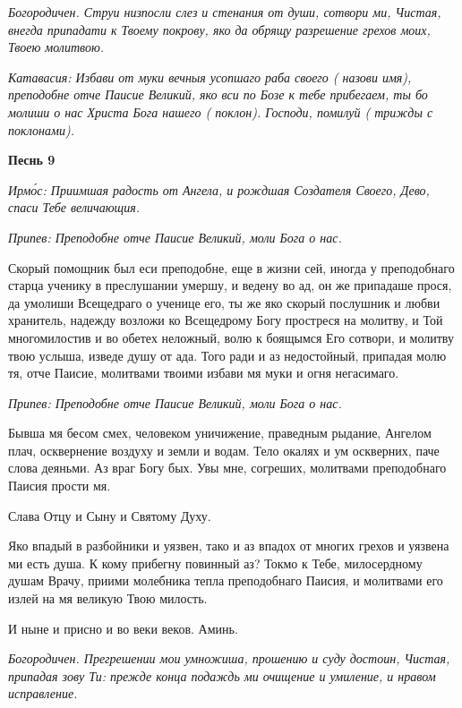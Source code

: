 \itshape Богородичен.\normalfont{} Струи низпосли слез и стенания от души, сотвори ми, Чистая, внегда припадати к Твоему покрову, яко да обрящу разрешение грехов моих, Твоею молитвою.


\itshape Катавасия:\normalfont{} Избави от муки вечныя усопшаго раба своего ( \itshape назови имя\normalfont{}), преподобне отче Паисие Великий, яко вси по Бозе к тебе прибегаем, ты бо молиши о нас Христа Бога нашего ( \itshape поклон\normalfont{}). Господи, помилуй ( \itshape трижды с поклонами\normalfont{}).





\bfseries Песнь 9\normalfont{}


\itshape Ирмо́с:\normalfont{} Приимшая радость от Ангела, и рождшая Создателя Своего, Дево, спаси Тебе величающия.


\itshape Припев:\normalfont{} Преподобне отче Паисие Великий, моли Бога о нас.


Скорый помощник был еси преподобне, еще в жизни сей, иногда у преподобнаго старца ученику в преслушании умершу, и ведену во ад, он же припадаше прося, да умолиши Всещедраго о ученице его, ты же яко скорый послушник и любви хранитель, надежду возложи ко Всещедрому Богу простреся на молитву, и Той многомилостив и во обетех неложный, волю к боящымся Его сотвори, и молитву твою услыша, изведе душу от ада. Того ради и аз недостойный, припадая молю тя, отче Паисие, молитвами твоими избави мя муки и огня негасимаго.


\itshape Припев:\normalfont{} Преподобне отче Паисие Великий, моли Бога о нас.


Бывша мя бесом смех, человеком уничижение, праведным рыдание, Ангелом плач, осквернение воздуху и земли и водам. Тело окалях и ум оскверних, паче слова деяньми. Аз враг Богу бых. Увы мне, согреших, молитвами преподобнаго Паисия прости мя.


Слава Отцу и Сыну и Святому Духу.


Яко впадый в разбойники и уязвен, тако и аз впадох от многих грехов и уязвена ми есть душа. К кому прибегну повинный аз? Токмо к Тебе, милосердному душам Врачу, приими молебника тепла преподобнаго Паисия, и молитвами его излей на мя великую Твою милость.


И ныне и присно и во веки веков. Аминь.


\itshape Богородичен.\normalfont{} Прегрешении мои умножиша, прошению и суду достоин, Чистая, припадая зову Ти: прежде конца подаждь ми очищение и умиление, и нравом исправление.


